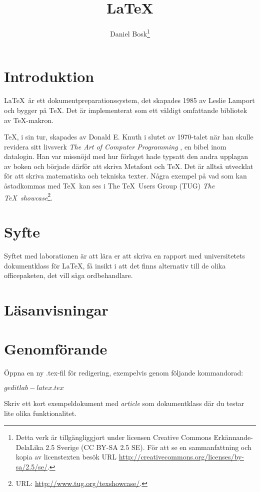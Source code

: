 \documentclass[a4paper]{miunasgn}
\title{\LaTeX}
\author{Daniel Bosk\footnote{%
	Detta verk är tillgängliggjort under licensen Creative Commons 
	Erkännande-DelaLika 2.5 Sverige (CC BY-SA 2.5 SE).
	För att se en sammanfattning och kopia av licenstexten besök URL 
	\url{http://creativecommons.org/licenses/by-sa/2.5/se/}.
}}
\date{\svnId}
\begin{document}
\maketitle
\thispagestyle{foot}
\tableofcontents


\section{Introduktion}
\label{sec:Introduktion}
\noindent
\LaTeX\ är ett dokumentpreparationssystem, det skapades 1985 av Leslie Lamport 
och bygger på \TeX.
Det är implementerat som ett väldigt omfattande bibliotek av \TeX-makron.

\TeX, i sin tur, skapades av Donald E. Knuth i slutet av 1970-talet när han 
skulle revidera sitt livsverk \emph{The Art of Computer Programming} 
\citep{TUG2011jwi}, en bibel inom datalogin.
Han var missnöjd med hur förlaget hade typsatt den andra upplagan av boken och 
började därför att skriva Metafont och \TeX.
Det är alltså utvecklat för att skriva matematiska och tekniska texter.
Några exempel på vad som kan åstadkommas med \TeX\ kan ses i The \TeX\ Users 
Group (TUG) \emph{The \TeX\ showcase}\footnote{%
	URL: \url{http://www.tug.org/texshowcase/}.
}.


\section{Syfte}
\label{sec:Syfte}
\noindent
Syftet med laborationen är att lära er att skriva en rapport med universitetets 
dokumentklass för \LaTeX, få insikt i att det finns alternativ till de olika 
officepaketen, det vill säga ordbehandlare.


\section{Läsanvisningar}
\label{sec:Lasanvisningar}
\noindent



\section{Genomförande}
\label{sec:Genomforande}
\noindent
Öppna en ny .tex-fil för redigering, exempelvis genom följande kommandorad:
\begin{terminal}
$ gedit lab-latex.tex
$
\end{terminal}
Skriv ett kort exempeldokument med \emph{article} som dokumentklass där du 
testar lite olika funktionalitet.
\end{document}
